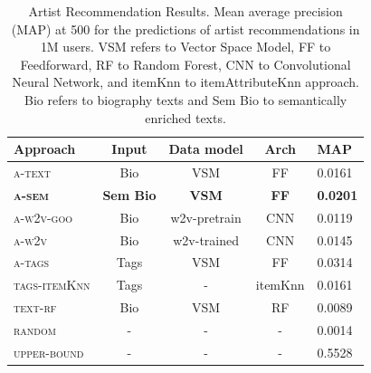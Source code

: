 \begin{table}
\centering
\begin{tabular}{lcccl}
\toprule
\textbf{Approach} & \textbf{Input}   & \textbf{Data model} & \textbf{Arch} & \textbf{MAP} \\ \midrule
\textsc{a-text}                                   & Bio              & VSM                 & FF            & 0.0161                            \\ 
\textbf{\textsc{a-sem}}                           & \textbf{Sem Bio} & \textbf{VSM}        & \textbf{FF}   & \textbf{0.0201}                   \\
\textsc{a-w2v-goo}                                & Bio              & w2v-pretrain        & CNN           & 0.0119                            \\ 
\textsc{a-w2v}                                    & Bio              & w2v-trained         & CNN           & 0.0145                            \\ \midrule
\textsc{a-tags}                                   & Tags             & VSM                 & FF            & 0.0314                            \\ 
\textsc{tags-itemKnn}                                   & Tags             & -                 & itemKnn            & 0.0161                            \\ 
\textsc{text-rf}                                & Bio              & VSM                 & RF            & 0.0089                            \\ \midrule
\textsc{random}                                 & -                & -                   & -             & 0.0014                            \\
\textsc{upper-bound}                            & -                & -                   & -             & 0.5528                            \\ \bottomrule
\end{tabular}
\caption[Artist Recommendation Results.]{Artist Recommendation Results. Mean average precision (MAP) at 500 for the predictions of artist recommendations in 1M users. VSM refers to Vector Space Model, FF to Feedforward, RF to Random Forest, CNN to Convolutional Neural Network, and itemKnn to itemAttributeKnn approach. Bio refers to biography texts and Sem Bio to semantically enriched texts.}
\label{tbl:cold-rec:artists}
\end{table}

